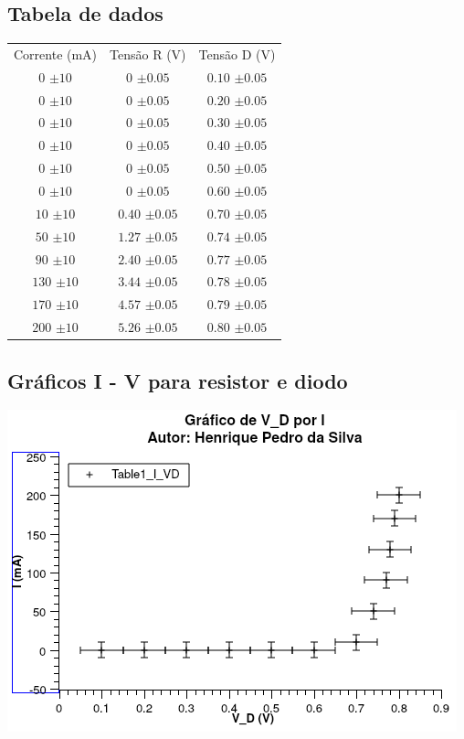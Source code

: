 \documentclass[12pt,twoside, a4paper, twocolumn]{article}
\begin{document}
\subsection{Tabela de dados}
\begin{center}
    \begin{tabular}{ |ccc| }
        \hline
        Corrente (mA) & Tensão R (V)     & Tensão D (V)     \\
        $0$ $\pm10$   & $0$ $\pm0.05$    & $0.10$ $\pm0.05$ \\
        $0$ $\pm10$   & $0$ $\pm0.05$    & $0.20$ $\pm0.05$ \\
        $0$ $\pm10$   & $0$ $\pm0.05$    & $0.30$ $\pm0.05$ \\
        $0$ $\pm10$   & $0$ $\pm0.05$    & $0.40$ $\pm0.05$ \\
        $0$ $\pm10$   & $0$ $\pm0.05$    & $0.50$ $\pm0.05$ \\
        $0$ $\pm10$   & $0$ $\pm0.05$    & $0.60$ $\pm0.05$ \\
        $10$ $\pm10$  & $0.40$ $\pm0.05$ & $0.70$ $\pm0.05$ \\
        $50$ $\pm10$  & $1.27$ $\pm0.05$ & $0.74$ $\pm0.05$ \\
        $90$ $\pm10$  & $2.40$ $\pm0.05$ & $0.77$ $\pm0.05$ \\
        $130$ $\pm10$ & $3.44$ $\pm0.05$ & $0.78$ $\pm0.05$ \\
        $170$ $\pm10$ & $4.57$ $\pm0.05$ & $0.79$ $\pm0.05$ \\
        $200$ $\pm10$ & $5.26$ $\pm0.05$ & $0.80$ $\pm0.05$ \\



        \hline
    \end{tabular}
\end{center}


\subsection{Gráficos I - V para resistor e diodo}

\begin{adjustbox}{scale=0.70}
    \includegraphics{Graph6.png}
\end{adjustbox}
\end{document}
